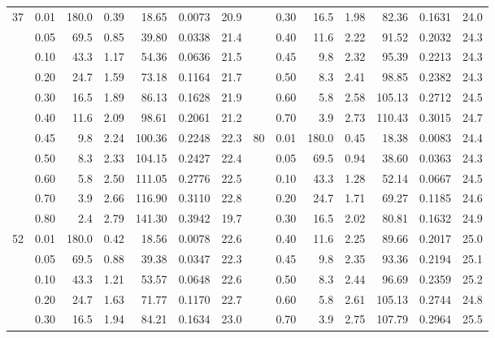 \begin{table}[H]
{\begin{tabular}{|r|r|r|r|r|r|r||r|r|r|r|r|r|r|}
37 & 0.01 & 180.0  & 0.39 & 18.65  & 0.0073 & 20.9 &    & 0.30  & 16.5 & 1.98 & 82.36  & 0.1631 & 24.0  \\ \cline{2-7} \cline{9-14} 
   & 0.05 & 69.5 & 0.85 & 39.80   & 0.0338  & 21.4 &    & 0.40  & 11.6 & 2.22 & 91.52  & 0.2032 & 24.3 \\ \cline{2-7} \cline{9-14} 
   & 0.10  & 43.3 & 1.17 & 54.36  & 0.0636 & 21.5 &    & 0.45 & 9.8  & 2.32 & 95.39  & 0.2213 & 24.3 \\ \cline{2-7} \cline{9-14} 
   & 0.20  & 24.7 & 1.59 & 73.18  & 0.1164 & 21.7 &    & 0.50  & 8.3  & 2.41 & 98.85  & 0.2382 & 24.3 \\ \cline{2-7} \cline{9-14} 
   & 0.30  & 16.5 & 1.89 & 86.13  & 0.1628 & 21.9 &    & 0.60  & 5.8  & 2.58 & 105.13 & 0.2712 & 24.5 \\ \cline{2-7} \cline{9-14} 
   & 0.40  & 11.6 & 2.09 & 98.61  & 0.2061 & 21.2 &    & 0.70  & 3.9  & 2.73 & 110.43 & 0.3015 & 24.7 \\ \cline{2-14} 
   & 0.45 & 9.8  & 2.24 & 100.36 & 0.2248 & 22.3 & 80 & 0.01 & 180.0  & 0.45 & 18.38  & 0.0083 & 24.4 \\ \cline{2-7} \cline{9-14} 
   & 0.50  & 8.3  & 2.33 & 104.15 & 0.2427  & 22.4 &    & 0.05 & 69.5 & 0.94 & 38.60   & 0.0363 & 24.3 \\ \cline{2-7} \cline{9-14} 
   & 0.60  & 5.8  & 2.50  & 111.05 & 0.2776 & 22.5 &    & 0.10  & 43.3 & 1.28 & 52.14  & 0.0667 & 24.5 \\ \cline{2-7} \cline{9-14} 
   & 0.70  & 3.9  & 2.66 & 116.90  & 0.3110 & 22.8 &    & 0.20  & 24.7 & 1.71 & 69.27  & 0.1185 & 24.6 \\ \cline{2-7} \cline{9-14} 
   & 0.80  & 2.4  & 2.79 & 141.30  & 0.3942 & 19.7 &    & 0.30  & 16.5 & 2.02 & 80.81  & 0.1632 & 24.9 \\ \cline{1-7} \cline{9-14} 
52 & 0.01 & 180.0  & 0.42 & 18.56  & 0.0078 & 22.6 &    & 0.40  & 11.6 & 2.25 & 89.66  & 0.2017 & 25.0 \\ \cline{2-7} \cline{9-14} 
   & 0.05 & 69.5 & 0.88 & 39.38  & 0.0347 & 22.3 &    & 0.45 & 9.8  & 2.35 & 93.36  & 0.2194 & 25.1 \\ \cline{2-7} \cline{9-14} 
   & 0.10  & 43.3 & 1.21 & 53.57  & 0.0648  & 22.6 &    & 0.50  & 8.3  & 2.44 & 96.69  & 0.2359 & 25.2 \\ \cline{2-7} \cline{9-14} 
   & 0.20  & 24.7 & 1.63 & 71.77  & 0.1170 & 22.7 &    & 0.60  & 5.8  & 2.61 & 105.13 & 0.2744 & 24.8 \\ \cline{2-7} \cline{9-14} 
   & 0.30  & 16.5 & 1.94 & 84.21  & 0.1634 & 23.0 &    & 0.70  & 3.9  & 2.75 & 107.79 & 0.2964 & 25.5 \\ \hline
\end{tabular}
}
\end{table}

